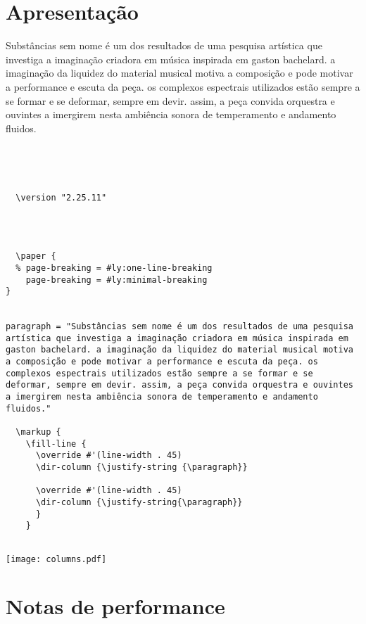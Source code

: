\documentclass[11pt]{article}
\author{Davi Raubach Tuchtenhagen}
\date{\today}
\title{}
\begin{document}
\section{Apresentação}
\label{sec:orgdab6f90}

Substâncias sem nome é um dos resultados de uma pesquisa artística que investiga a imaginação criadora em música inspirada em gaston bachelard. a imaginação da liquidez do material musical motiva a composição e pode motivar a performance e escuta da peça. os complexos espectrais utilizados estão sempre a se formar e se deformar, sempre em devir. assim, a peça convida orquestra e ouvintes a imergirem nesta ambiência sonora de temperamento e andamento fluidos.

\begin{verbatim}




  \version "2.25.11"
  



  \paper {
  % page-breaking = #ly:one-line-breaking
    page-breaking = #ly:minimal-breaking
}


paragraph = "Substâncias sem nome é um dos resultados de uma pesquisa artística que investiga a imaginação criadora em música inspirada em gaston bachelard. a imaginação da liquidez do material musical motiva a composição e pode motivar a performance e escuta da peça. os complexos espectrais utilizados estão sempre a se formar e se deformar, sempre em devir. assim, a peça convida orquestra e ouvintes a imergirem nesta ambiência sonora de temperamento e andamento fluidos."

  \markup {
    \fill-line {
      \override #'(line-width . 45)
      \dir-column {\justify-string {\paragraph}}

      \override #'(line-width . 45)
      \dir-column {\justify-string{\paragraph}}
      }
    }


\end{verbatim}

\begin{center}
\texttt{[image: columns.pdf]}
\end{center}


\section{Notas de performance}
\label{sec:org650add5}
\end{document}
